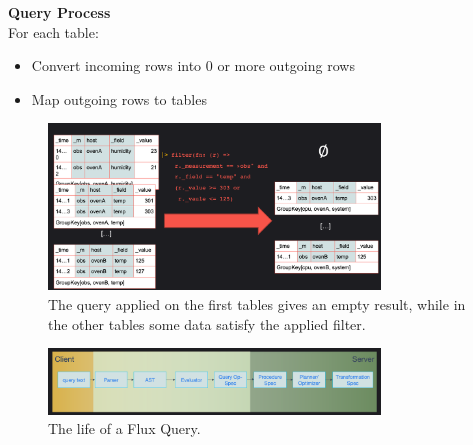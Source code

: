 \documentclass[10pt,a4paper]{article}
\begin{document}
\pagebreak
 \textbf{Query Process} \\
 For each table:
 \begin{itemize}
 	\item Convert incoming rows into 0 or more outgoing rows
 	\item Map outgoing rows to tables
 \end{itemize}
   \begin{figure}[ht!]
 \hfill \includegraphics[width=250pt]{images/flux-query-process}
 \hspace*{\fill}
 \caption{The query applied on the first tables gives an empty result, while in the other tables some data satisfy the applied filter.}
 \end{figure} 
    \begin{figure}[ht!]
 \hfill \includegraphics[width=250pt]{images/flux-query-life}
 \hspace*{\fill}
 \caption{The life of a Flux Query.}
 \end{figure} 
\end{document}
